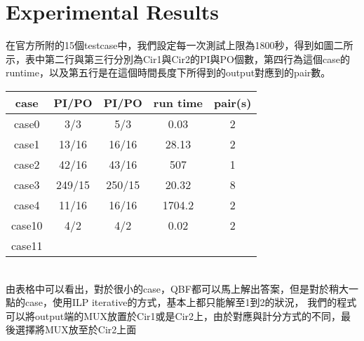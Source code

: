 \section{Experimental Results}

在官方所附的15個testcase中，我們設定每一次測試上限為1800秒，得到如圖二所示，表中第二行與第三行分別為Cir1與Cir2的PI與PO個數，第四行為這個case的runtime，以及第五行是在這個時間長度下所得到的output對應到的pair數。\\

\begin{tabular}{|c|c|c|c|c|}
\hline
case & PI/PO & PI/PO & run time & pair(s) \\
\hline
case0 & 3/3 & 5/3 & 0.03 & 2 \\
\hline
case1 & 13/16 & 16/16 & 28.13 & 2 \\
\hline
case2 & 42/16 & 43/16 & 507 & 1 \\
\hline
case3 & 249/15 & 250/15 & 20.32 & 8 \\
\hline
case4 & 11/16 & 16/16 & 1704.2 & 2 \\
\hline
case10 & 4/2 & 4/2 & 0.02 & 2 \\
\hline
case11 &&&& \\
\hline
\end{tabular}
\\

由表格中可以看出，對於很小的case，QBF都可以馬上解出答案，但是對於稍大一點的case，使用ILP iterative的方式，基本上都只能解至1到2的狀況，
我們的程式可以將output端的MUX放置於Cir1或是Cir2上，由於對應與計分方式的不同，最後選擇將MUX放至於Cir2上面




